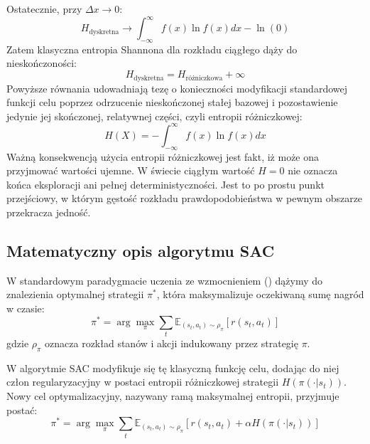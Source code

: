 \documentclass[12pt,twoside]{article}
\begin{document}
Ostatecznie, przy $\Delta x \to 0$:
\begin{equation}
H_{\text{dyskretna}} \to \int_{-\infty}^{\infty} f(x) \ln f(x) dx - \ln(0)
\label{eq:shannon_granica}
\end{equation}
Zatem klasyczna entropia Shannona dla rozkładu ciągłego dąży do nieskończoności:
\begin{equation}
H_{\text{dyskretna}} = H_{\text{różniczkowa}} + \infty
\label{eq:shannon_nieskonczonosc}
\end{equation}
Powyższe równania udowadniają tezę o konieczności modyfikacji standardowej funkcji celu poprzez odrzucenie nieskończonej stałej bazowej i pozostawienie jedynie jej skończonej, relatywnej części, czyli entropii różniczkowej:
\begin{equation}
H(X) = -\int_{-\infty}^{\infty} f(x) \ln f(x) dx
\label{eq:entropia_rozniczkowa}
\end{equation}
Ważną konsekwencją użycia entropii różniczkowej jest fakt, iż może ona przyjmować wartości ujemne. W świecie ciągłym wartość $H=0$ nie oznacza końca eksploracji ani pełnej deterministyczności. Jest to po prostu punkt przejściowy, w którym gęstość rozkładu prawdopodobieństwa w pewnym obszarze przekracza jedność.


\subsection{Matematyczny opis algorytmu SAC}

W standardowym paradygmacie uczenia ze wzmocnieniem (\cite{str9}) dążymy do znalezienia optymalnej strategii $\pi^*$, która maksymalizuje oczekiwaną sumę nagród w czasie:
\begin{equation}
\pi^* = \arg\max_{\pi} \sum_{t} \mathbb{E}_{(s_t, a_t) \sim \rho_{\pi}} [r(s_t, a_t)]
\label{eq:klasyczne_rl}
\end{equation}
gdzie $\rho_{\pi}$ oznacza rozkład stanów i akcji indukowany przez strategię $\pi$.

W algorytmie SAC modyfikuje się tę klasyczną funkcję celu, dodając do niej człon regularyzacyjny w postaci entropii różniczkowej strategii $H(\pi(\cdot | s_t))$. Nowy cel optymalizacyjny, nazywany ramą maksymalnej entropii, przyjmuje postać:
\begin{equation}
\pi^* = \arg\max_{\pi} \sum_{t} \mathbb{E}_{(s_t, a_t) \sim \rho_{\pi}} \left[ r(s_t, a_t) + \alpha H(\pi(\cdot | s_t)) \right]
\label{eq:sac_cel_glowny}
\end{equation}
\end{document}
